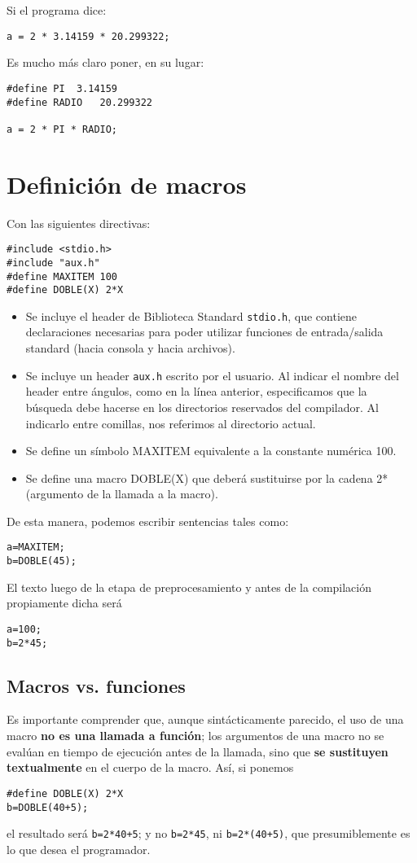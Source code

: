 Si el programa dice:
\begin{lstlisting}
a = 2 * 3.14159 * 20.299322;
\end{lstlisting}
Es mucho más claro poner, en su lugar:
\begin{lstlisting}
#define PI	3.14159
#define RADIO	20.299322

a = 2 * PI * RADIO;
\end{lstlisting}



\section{Definición de macros}
Con las siguientes directivas:
\begin{lstlisting}
#include <stdio.h>
#include "aux.h"
#define MAXITEM 100
#define DOBLE(X) 2*X
\end{lstlisting}

\begin{itemize}
	\item Se incluye el header de Biblioteca Standard \lstinline{stdio.h}, que contiene declaraciones necesarias para
poder utilizar funciones de entrada/salida standard (hacia consola y hacia archivos).
\item Se incluye un header \lstinline{aux.h} escrito por el usuario. Al indicar el nombre del header entre ángulos, como en la línea anterior, especificamos que la búsqueda debe hacerse en los directorios reservados del compilador. Al indicarlo entre comillas, nos referimos al directorio actual.
\item Se define un símbolo MAXITEM equivalente a la constante numérica 100.
\item Se define una macro DOBLE(X) que deberá sustituirse por la cadena 2*(argumento de la llamada
a la macro).
\end{itemize}

De esta manera, podemos escribir sentencias tales como:
\begin{lstlisting}
a=MAXITEM;
b=DOBLE(45);
\end{lstlisting}
El texto luego de la etapa de preprocesamiento y antes de la compilación propiamente dicha será
\begin{lstlisting}
a=100;
b=2*45;
\end{lstlisting}

\subsection{Macros vs. funciones}
Es importante comprender que, aunque sintácticamente parecido, el uso de una macro \textbf{no es una
llamada a función}; los argumentos de una macro no se evalúan en tiempo de ejecución antes de la
llamada, sino que \textbf{se sustituyen textualmente} en el cuerpo de la macro. Así, si ponemos
\begin{lstlisting}
#define DOBLE(X) 2*X
b=DOBLE(40+5);
\end{lstlisting}
el resultado será \lstinline{b=2*40+5}; y no \lstinline{b=2*45}, ni \lstinline{b=2*(40+5)}, que presumiblemente es lo que desea el
programador.

